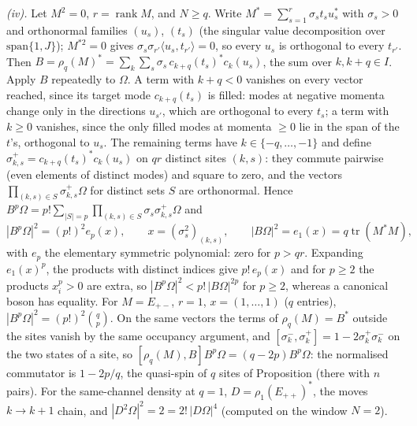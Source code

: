 \emph{(iv).} Let $M^{2} = 0$, $r = \operatorname{rank}M$, and $N \ge q$. Write $M^{*} = \sum_{s=1}^{r}\sigma_{s}t_{s}u_{s}^{*}$ with $\sigma_{s} > 0$ and orthonormal families $(u_{s})$, $(t_{s})$ (the singular value decomposition over $\mathrm{span}\{1, J\}$); $M^{*2} = 0$ gives $\sigma_{s}\sigma_{r'}\langle u_{s}, t_{r'}\rangle = 0$, so every $u_{s}$ is orthogonal to every $t_{r'}$. Then $B = \rho_{q}(M)^{*} = \sum_{k}\sum_{s}\sigma_{s}\,c_{k+q}(t_{s})^{*}c_{k}(u_{s})$, the sum over $k, k + q \in I$. Apply $B$ repeatedly to $\Omega$. A term with $k + q < 0$ vanishes on every vector reached, since its target mode $c_{k+q}(t_{s})$ is filled: modes at negative momenta change only in the directions $u_{s'}$, which are orthogonal to every $t_{s}$; a term with $k \ge 0$ vanishes, since the only filled modes at momenta $\ge 0$ lie in the span of the $t$'s, orthogonal to $u_{s}$. The remaining terms have $k \in \{-q, \dots, -1\}$ and define $\sigma_{k,s}^{+} = c_{k+q}(t_{s})^{*}c_{k}(u_{s})$ on $qr$ distinct sites $(k, s)$: they commute pairwise (even elements of distinct modes) and square to zero, and the vectors $\prod_{(k,s)\in S}\sigma_{k,s}^{+}\Omega$ for distinct sets $S$ are orthonormal. Hence $B^{p}\Omega = p!\sum_{|S| = p}\prod_{(k,s)\in S}\sigma_{s}\sigma_{k,s}^{+}\Omega$ and
\[
|B^{p}\Omega|^{2} = (p!)^{2}e_{p}(x), \qquad x = (\sigma_{s}^{2})_{(k,s)}, \qquad |B\Omega|^{2} = e_{1}(x) = q\operatorname{tr}(M^{*}M),
\]
with $e_{p}$ the elementary symmetric polynomial: zero for $p > qr$. Expanding $e_{1}(x)^{p}$, the products with distinct indices give $p!\,e_{p}(x)$ and for $p \ge 2$ the products $x_{i}^{p} > 0$ are extra, so $|B^{p}\Omega|^{2} < p!\,|B\Omega|^{2p}$ for $p \ge 2$, whereas a canonical boson has equality. For $M = E_{+-}$, $r = 1$, $x = (1, \dots, 1)$ ($q$ entries), $|B^{p}\Omega|^{2} = (p!)^{2}\binom{q}{p}$. On the same vectors the terms of $\rho_{q}(M) = B^{*}$ outside the sites vanish by the same occupancy argument, and $[\sigma_{k}^{-}, \sigma_{k}^{+}] = 1 - 2\sigma_{k}^{+}\sigma_{k}^{-}$ on the two states of a site, so $[\rho_{q}(M), B]B^{p}\Omega = (q - 2p)B^{p}\Omega$: the normalised commutator is $1 - 2p/q$, the quasi-spin of $q$ sites of Proposition  (there with $n$ pairs). For the same-channel density at $q = 1$, $D = \rho_{1}(E_{++})^{*}$, the moves $k \to k + 1$ chain, and $|D^{2}\Omega|^{2} = 2 = 2!\,|D\Omega|^{4}$ (computed on the window $N = 2$).

